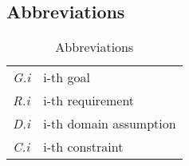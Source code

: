 \subsection{Abbreviations}

\begin{center}
\setlength\tabcolsep{7pt}
\renewcommand{\arraystretch}{2}
\begin{longtable}{|m{1.5cm}|m{8.6cm}|}
\caption{Abbreviations}\\
\hline
\endfirsthead
\endhead
\hline
\endlastfoot
\hline
\textit{G.i} & i-th goal\\
\textit{R.i} & i-th requirement\\
\textit{D.i} & i-th domain assumption\\
\textit{C.i} & i-th constraint\\
\hline
\end{longtable}
\end{center}